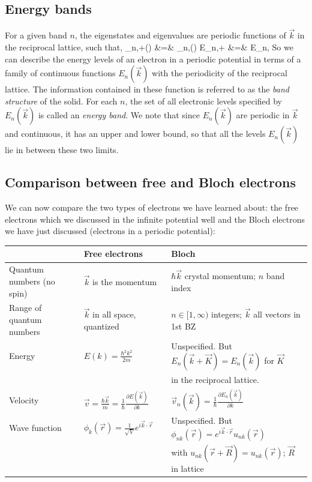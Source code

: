 \documentclass{Textbook}
\begin{document}
\subsection{Energy bands}
For a given band $n$, the eigenstates and eigenvalues are periodic functions of $\vec{k}$ in the reciprocal lattice, such that,
\bea 
\phi_{n,+}() &=& \phi_{n,}() \nn
E_{n,+} &=& E_{n,}
\eea
So we can describe the energy levels of an electron in a periodic potential in terms of a family of continuous functions $E_{n}(\vec{k})$ with the periodicity of the reciprocal lattice. The information contained in these function is referred to as the \emph{band structure} of the solid.\nl
For each $n$, the set of all electronic levels specified by $E_n(\vec{k})$ is called an \emph{energy band}. We note that since $E_n(\vec{k})$ are periodic in $\vec{k}$ and continuous, it has an upper and lower bound, so that all the levels $E_n(\vec{k})$ lie in between these two limits.
\subsection{Comparison between free and Bloch electrons}
We can now compare the two types of electrons we have learned about: the free electrons which we discussed in the infinite potential well and the Bloch electrons we have just discussed (electrons in a periodic potential):

\noindent \begin{tabular}{|l|l|l|}
\hline
 & Free electrons & Bloch \\
 \hline
Quantum numbers (no spin) & $\vec{k}$ is the momentum & $\hbar \vec{k}$ crystal momentum; $n$ band index\\ 
 \hline
Range of quantum numbers & $\vec{k}$ in all space, quantized & $n\in[1,\infty)$ integers; $\vec{k}$ all vectors in 1st BZ \\
\hline
Energy & $E(k)= \frac{\hbar^2k^2}{2m}$ & Unspecified. But $E_n(\vec{k}+\vec{K})=E_n(\vec{k})$ for $\vec{K}$ \\
& & in the reciprocal lattice. \\
\hline
Velocity & $\vec{v} = \frac{\hbar\vec{k}}{m} = \frac{1}{\hbar}\frac{\partial E(\vec{k})}{\partial k}$ & $\vec{v}_n(\vec{k})=\frac{1}{\hbar}\frac{\partial E_n(\vec{k})}{\partial k}$ \\
\hline
Wave function & $\phi_k(\vec{r}) = \frac{1}{\sqrt{V}}e^{i\vec{k}\cdot\vec{r}}$ & Unspecified. But $\phi_{nk}(\vec{r})=e^{i\vec{k}\cdot\vec{r}}u_{nk}(\vec{r})$ \\
&& with $u_{nk}(\vec{r}+\vec{R})=u_{nk}(\vec{r})$; $\vec{R}$ in lattice \\
\hline
\end{tabular}
\end{document}
